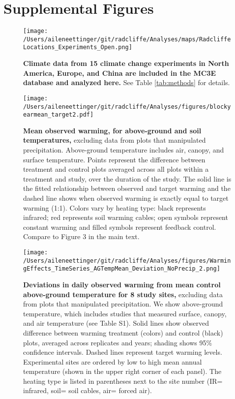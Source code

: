 \documentclass{article}
\begin{document}
\section* {Supplemental Figures}
\begin{figure}[p]
\centering
\texttt{[image: /Users/aileneettinger/git/radcliffe/Analyses/maps/RadcliffeLocations\_Experiments\_Open.png]} 
\caption{\textbf{Climate data from 15 climate change experiments in North America, Europe, and China are included in the MC3E database and analyzed here.} See Table \ref{tab:methods} for details.} 
\label{fig:map}
\end{figure}
\clearpage
\begin{figure}[h]
\centering
\texttt{[image: /Users/aileneettinger/git/radcliffe/Analyses/figures/blockyearmean\_target2.pdf]}
\caption{\textbf{Mean observed warming, for above-ground and soil temperatures,} excluding data from plots that manipulated precipitation. Above-ground temperature includes air, canopy, and surface temperature. Points represent the difference between treatment and control plots averaged across all plots within a treatment and study, over the duration of the study. The solid line is the fitted relationship between observed and target warming and the dashed line shows when observed warming is exactly equal to target warming (1:1). Colors vary by heating type: black represents infrared; red represents soil warming cables; open symbols represent constant warming and filled symbols represent feedback control. Compare to Figure 3 in the main text.}
 \label{fig:blockyear}
 \end{figure}
\clearpage
\begin{figure}[h]
\centering
\texttt{[image: /Users/aileneettinger/git/radcliffe/Analyses/figures/WarmingEffects\_TimeSeries\_AGTempMean\_Deviation\_NoPrecip\_2.png]}
\caption{\textbf{Deviations in daily observed warming from mean control above-ground temperature for 8 study sites,} excluding data from plots that manipulated precipitation. We show above-ground temperature, which includes studies that measured surface, canopy, and air temperature (see Table S1). Solid lines show observed difference between warming treatment (colors) and control (black) plots, averaged across replicates and years; shading shows 95\% confidence intervals. Dashed lines represent target warming levels. Experimental sites are ordered by low to high mean annual temperature (shown in the upper right corner of each panel). The heating type is listed in parentheses next to the site number (IR= infrared, soil= soil cables, air= forced air).} 
\label{fig:effwarmagtemp}
\end{figure}

% 
\end{document}
